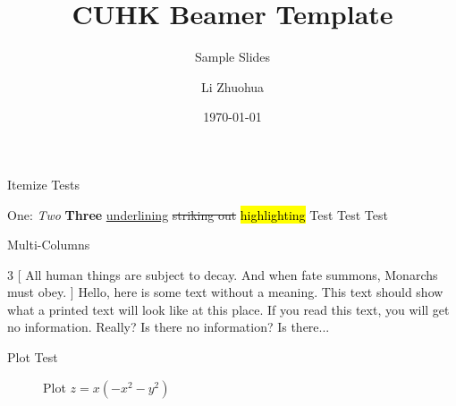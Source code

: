 

\title[Sample]{CUHK Beamer Template}
\subtitle{Sample Slides}
\author[Li Zhuohua]{Li Zhuohua}
\date{\today}



\frame[plain]{\maketitle}


\begin{frame}{Itemize Tests}
	\renewcommand{\outlineii}{enumerate}
	\begin{outline}
		\1 One: \textit{Two} \textbf{Three}
			\2 
			\2 \ul{underlining}
			\2 \st{striking out}
			\2 \hl{highlighting}
			\2 
		\1 Test Test Test
	\end{outline}
\end{frame}

\begin{frame}{Multi-Columns}
	\begin{multicols}{3}
    [
    All human things are subject to decay. And when fate summons, Monarchs must obey.
    ]
    Hello, here is some text without a meaning.  This text should show what 
    a printed text will look like at this place.
    If you read this text, you will get no information.  Really?  Is there 
    no information?  Is there...
    \end{multicols}
\end{frame}

\begin{frame}{Plot Test}
    \pgfplotsset{width=5.5cm,compat=1.9}
    \begin{figure}
        \centering
        \caption{Plot $z=x(-x^2-y^2)$} \label{fig:plot}
    \end{figure}
\end{frame}

